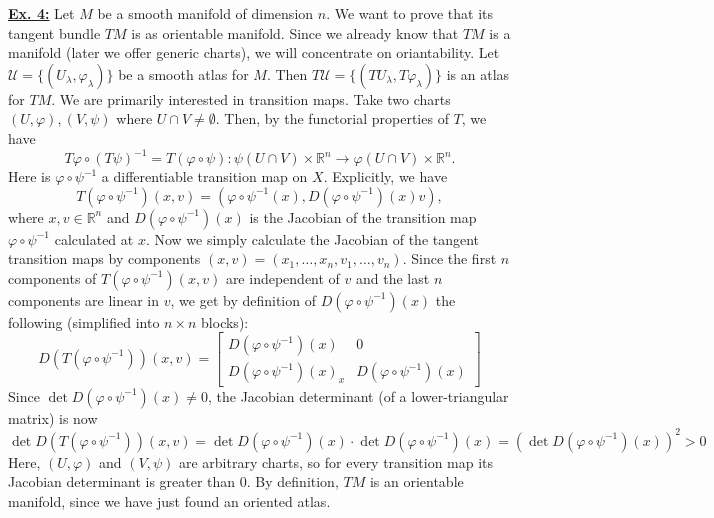 \documentclass[a4paper, 12pt]{article} %
\newcommand{\R}{\mathbb{R}}
\begin{document}
\underline{\textbf{Ex. 4:}}
Let $M$ be a smooth manifold of dimension $n$. We want to prove that its tangent bundle $TM$ is as orientable manifold.
Since we already know that $TM$ is a manifold (later we offer generic charts), we will concentrate on oriantability. Let $\mathcal{U} = \lbrace (U_\lambda, \varphi_\lambda) \rbrace$ be a smooth atlas for $M$. Then $T\mathcal{U} = \lbrace (TU_\lambda, T\varphi_\lambda) \rbrace$ is an atlas for $TM$. We are primarily interested in transition maps.
Take two charts $(U, \varphi), (V, \psi)$ where $U \cap V \neq \emptyset$. Then, by the functorial properties of $T$, we have
\[
T\varphi\circ (T\psi)^{-1} = T(\varphi\circ\psi) \colon \psi(U\cap V) \times \R^n \to \varphi(U \cap V) \times \R^n.
\]
Here is $\varphi\circ\psi^{-1}$ a differentiable transition map on $X$. Explicitly, we have
\[
T(\varphi\circ\psi^{-1})(x, v) = (\varphi\circ\psi^{-1}(x), D(\varphi\circ\psi^{-1})(x)v),
\]
where $x, v \in \R^n$ and $D(\varphi\circ\psi^{-1})(x)$ is the Jacobian of the transition map $\varphi\circ\psi^{-1}$ calculated at $x$.
Now we simply calculate the Jacobian of the tangent transition maps by components $(x, v) = (x_1, \dots, x_n, v_1, \dots, v_n)$. Since the first $n$ components of $T(\varphi\circ\psi^{-1})(x, v)$ are independent of $v$ and the last $n$ components are linear in $v$, we get by definition of $D(\varphi\circ\psi^{-1})(x)$ the following (simplified into $n\times n$ blocks):
\[
D(T(\varphi\circ\psi^{-1}))(x, v) =
\begin{bmatrix}
D(\varphi\circ\psi^{-1})(x) & 0 \\
D(\varphi\circ\psi^{-1})(x)_x & D(\varphi\circ\psi^{-1})(x)
\end{bmatrix}
\]
Since $\det D(\varphi\circ\psi^{-1})(x) \neq 0$, the Jacobian determinant (of a lower-triangular matrix) is now
\[
\det D(T(\varphi\circ\psi^{-1}))(x, v) = \det D(\varphi\circ\psi^{-1})(x) \cdot \det D(\varphi\circ\psi^{-1})(x) = (\det D(\varphi\circ\psi^{-1})(x))^2 > 0
\]
Here, $(U, \varphi)$ and $(V, \psi)$ are arbitrary charts, so for every transition map its Jacobian determinant is greater than $0$. By definition, $TM$ is an orientable manifold, since we have just found an oriented atlas.
\end{document}
